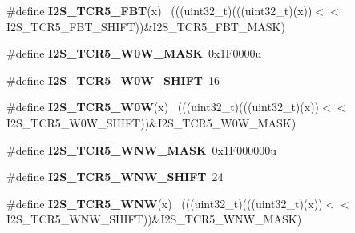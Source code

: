 \begin{DoxyCompactItemize}
\item 
\hypertarget{group___i2_s___register___masks_ga4b64363766a6e27ad151e3f1c90eb537}{}\#define {\bfseries I2\+S\+\_\+\+T\+C\+R5\+\_\+\+F\+B\+T}(x)                                                ~(((uint32\+\_\+t)(((uint32\+\_\+t)(x))$<$$<$I2\+S\+\_\+\+T\+C\+R5\+\_\+\+F\+B\+T\+\_\+\+S\+H\+I\+F\+T))\&I2\+S\+\_\+\+T\+C\+R5\+\_\+\+F\+B\+T\+\_\+\+M\+A\+S\+K)\label{group___i2_s___register___masks_ga4b64363766a6e27ad151e3f1c90eb537}

\item 
\hypertarget{group___i2_s___register___masks_ga8c6552a52f0e99068ae8869056e78ccb}{}\#define {\bfseries I2\+S\+\_\+\+T\+C\+R5\+\_\+\+W0\+W\+\_\+\+M\+A\+S\+K}~0x1\+F0000u\label{group___i2_s___register___masks_ga8c6552a52f0e99068ae8869056e78ccb}

\item 
\hypertarget{group___i2_s___register___masks_ga0b9f1161cd97d2be7e9ee7f680293e3d}{}\#define {\bfseries I2\+S\+\_\+\+T\+C\+R5\+\_\+\+W0\+W\+\_\+\+S\+H\+I\+F\+T}~16\label{group___i2_s___register___masks_ga0b9f1161cd97d2be7e9ee7f680293e3d}

\item 
\hypertarget{group___i2_s___register___masks_gad188d773cebe6deabdceef93e5050282}{}\#define {\bfseries I2\+S\+\_\+\+T\+C\+R5\+\_\+\+W0\+W}(x)                                                ~(((uint32\+\_\+t)(((uint32\+\_\+t)(x))$<$$<$I2\+S\+\_\+\+T\+C\+R5\+\_\+\+W0\+W\+\_\+\+S\+H\+I\+F\+T))\&I2\+S\+\_\+\+T\+C\+R5\+\_\+\+W0\+W\+\_\+\+M\+A\+S\+K)\label{group___i2_s___register___masks_gad188d773cebe6deabdceef93e5050282}

\item 
\hypertarget{group___i2_s___register___masks_gac7d0e32e2822b95984bd4c98097848e0}{}\#define {\bfseries I2\+S\+\_\+\+T\+C\+R5\+\_\+\+W\+N\+W\+\_\+\+M\+A\+S\+K}~0x1\+F000000u\label{group___i2_s___register___masks_gac7d0e32e2822b95984bd4c98097848e0}

\item 
\hypertarget{group___i2_s___register___masks_ga76459cafce1757f4ea37a3fca81514a7}{}\#define {\bfseries I2\+S\+\_\+\+T\+C\+R5\+\_\+\+W\+N\+W\+\_\+\+S\+H\+I\+F\+T}~24\label{group___i2_s___register___masks_ga76459cafce1757f4ea37a3fca81514a7}

\item 
\hypertarget{group___i2_s___register___masks_ga6702fa197478e6dec76000e98c6eee75}{}\#define {\bfseries I2\+S\+\_\+\+T\+C\+R5\+\_\+\+W\+N\+W}(x)                                                ~(((uint32\+\_\+t)(((uint32\+\_\+t)(x))$<$$<$I2\+S\+\_\+\+T\+C\+R5\+\_\+\+W\+N\+W\+\_\+\+S\+H\+I\+F\+T))\&I2\+S\+\_\+\+T\+C\+R5\+\_\+\+W\+N\+W\+\_\+\+M\+A\+S\+K)\label{group___i2_s___register___masks_ga6702fa197478e6dec76000e98c6eee75}


\end{DoxyCompactItemize}
